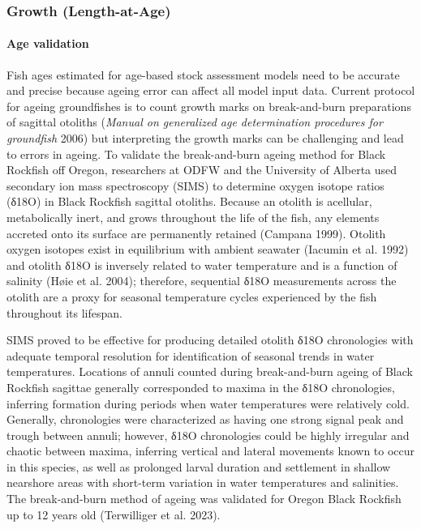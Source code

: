 \documentclass[11pt,
  english,
  letterpaper,
]{article}
\begin{document}
\hypertarget{growth-length-at-age}{%
\subsubsection{Growth (Length-at-Age)}\label{growth-length-at-age}}

\hypertarget{age-validation}{%
\paragraph{Age validation}\label{age-validation}}

Fish ages estimated for age-based stock assessment models need to be accurate and precise because ageing error can affect all model input data. Current protocol for ageing groundfishes is to count growth marks on break-and-burn preparations of sagittal otoliths (\emph{Manual on generalized age determination procedures for groundfish} 2006) but interpreting the growth marks can be challenging and lead to errors in ageing. To validate the break-and-burn ageing method for Black Rockfish off Oregon, researchers at ODFW and the University of Alberta used secondary ion mass spectroscopy (SIMS) to determine oxygen isotope ratios (δ18O) in Black Rockfish sagittal otoliths. Because an otolith is acellular, metabolically inert, and grows throughout the life of the fish, any elements accreted onto its surface are permanently retained (Campana 1999). Otolith oxygen isotopes exist in equilibrium with ambient seawater (Iacumin et al. 1992) and otolith δ18O is inversely related to water temperature and is a function of salinity (Høie et al. 2004); therefore, sequential δ18O measurements across the otolith are a proxy for seasonal temperature cycles experienced by the fish throughout its lifespan.

SIMS proved to be effective for producing detailed otolith δ18O chronologies with adequate temporal resolution for identification of seasonal trends in water temperatures. Locations of annuli counted during break-and-burn ageing of Black Rockfish sagittae generally corresponded to maxima in the δ18O chronologies, inferring formation during periods when water temperatures were relatively cold. Generally, chronologies were characterized as having one strong signal peak and trough between annuli; however, δ18O chronologies could be highly irregular and chaotic between maxima, inferring vertical and lateral movements known to occur in this species, as well as prolonged larval duration and settlement in shallow nearshore areas with short-term variation in water temperatures and salinities. The break-and-burn method of ageing was validated for Oregon Black Rockfish up to 12 years old (Terwilliger et al. 2023).
\end{document}
